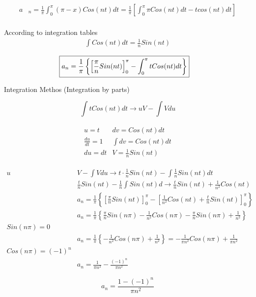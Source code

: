 \documentclass{article}
\begin{document}
\begin{align*}
    a&_n=\frac{1}{\pi} \int_{0}^{\pi}(\pi -x)Cos(nt)dt = \frac{1}{\pi}\left [ \int_{0}^{\pi} \pi Cos(nt)dt -tcos(nt)dt \right]\\   
\end{align*}

According to integration tables
\begin{align*}
 \int Cos(nt)dt = \frac{1}{n}Sin(nt)   
\end{align*}

\begin{align*}
   \Aboxed { a_n=\frac{1}{\pi} \left \{\left [\frac{\pi}{n} Sin(nt) \right ]_{0}^{\pi}      - \int_{0}^{\pi} tCos(nt)dt\right \}}
\end{align*}

Integration Methos (Integration by parts)

\begin{equation}
    \int tCos(nt)dt \rightarrow uV- \int V du
\end{equation}

\begin{align*}
    \begin{matrix}
u=t & dv=Cos(nt)dt\\ 
\frac{du}{dt}=1& \int dv =Cos(nt)dt\\ 
 du=dt& V=\frac{1}{n} Sin(nt)
\end{matrix}
\end{align*}

\begin{align*}
    u&V- \int V du \rightarrow t \cdot \frac{1}{n} Sin(nt)- \int \frac{1}{n} Sin(nt)dt\\
   &\frac{t}{n} Sin(nt)- \frac{1}{n} \int  Sin(nt)d \rightarrow  \frac{t}{n} Sin(nt)+ \frac{1}{n^2} Cos(nt)\\
   &a_n=\frac{1}{\pi} \left \{\left [\frac{\pi}{n} Sin(nt) \right ]_{0}^{\pi}      - \left[  \frac{1}{n^2} Cos(nt)+ \frac{t}{n} Sin(nt)\right]_{0}^{\pi}        \right \}\\
   &a_n=\frac{1}{\pi}\left \{ \frac{\pi}{n} Sin(n \pi)- \frac{1}{n^2} Cos(n \pi)-\frac{\pi}{n} Sin(n \pi)+\frac{1}{n^2}  \right \}\\
   Sin(n \pi) =0 \\
    &a_n=\frac{1}{\pi}\left \{ - \frac{1}{n^2} Cos(n \pi)+\frac{1}{n^2}  \right \} = - \frac{1}{\pi n^2} Cos(n \pi)+\frac{1}{\pi n^2}\\
    Cos(n \pi)=(-1)^n\\
    &a_n=\frac{1}{\pi n^2}- \frac{(-1)^n}{\pi n^2}
\end{align*}

\begin{equation}
    \boxed{ a_n=\frac{1-(-1)^n}{\pi n^2}}
\end{equation}
\end{document}
